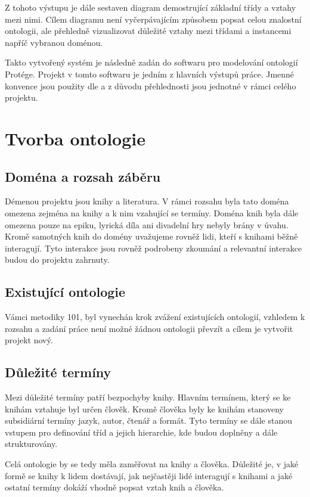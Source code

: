 \documentclass[a4paper,oneside,11pt,usenames,dvipsnames]{article}
\begin{document}
Z tohoto výstupu je dále sestaven diagram demostrující základní třídy a vztahy mezi nimi. Cílem diagramu není vyčerpávajícím způsobem popsat celou znalostní ontologii, ale přehledně vizualizovat důležité vztahy mezi třídami a instancemi napříč vybranou doménou.

Takto vytvořený systém je následně zadán do softwaru pro modelování ontologií Protége. Projekt v tomto softwaru je jedním z hlavních výstupů práce.
Jmenné konvence jsou použity dle \cite{noy2001ontology} a z důvodu přehlednosti jsou jednotné v rámci celého projektu.

\section{Tvorba ontologie}
\subsection{Doména a rozsah záběru}
Démenou projektu jsou knihy a literatura. V rámci rozsahu byla tato doména omezena zejména na knihy a k nim vzahující se termíny. Doména knih byla dále omezena pouze na epiku, lyrická díla ani divadelní hry nebyly brány v úvahu. Kromě samotných knih do domény uvažujeme rovněž lidi, kteří s knihami běžně interagují. Tyto interakce jsou rovněž podrobeny zkoumání a relevantní interakce budou do projektu zahrnuty.

\subsection{Existující ontologie}
Vámci metodiky 101, byl vynechán krok zvážení existujících ontologií, vzhledem k rozsahu a zadání práce není možné žádnou ontologii převzít a cílem je vytvořit projekt nový. 

\subsection{Důležité termíny}
Mezi důležité termíny patří bezpochyby knihy. Hlavním termínem, který se ke knihám vztahuje byl určen člověk. Kromě člověka byly ke knihám stanoveny subsidiární termíny jazyk, autor, čtenář a formát. Tyto termíny se dále stanou vstupem pro definování tříd a jejich hierarchie, kde budou doplněny a dále strukturovány.

Celá ontologie by se tedy měla zaměřovat na knihy a člověka. Důležité je, v jaké formě se knihy k lidem dostávají, jak nejčastěji lidé interagují s knihami a jaké ostatní termíny dokáží vhodně popsat vztah knih a člověka.
\end{document}
